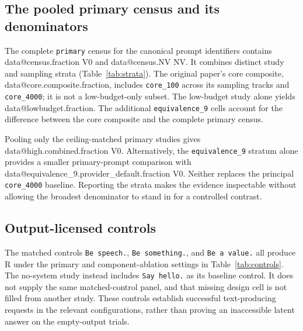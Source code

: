 \documentclass[11pt]{article}
\makeatletter
\newcommand{\D}[1]{\csname data@#1\endcsname}
\makeatother
\begin{document}
\subsection{The pooled primary census and its denominators}
The complete \texttt{primary} census for the canonical prompt identifiers contains \D{census.fraction} V0 and \D{census.NV} NV. It combines distinct study and sampling strata (Table~\ref{tab:strata}). The original paper's core composite, \D{core.composite.fraction}, includes \texttt{core\_100} across its sampling tracks and \texttt{core\_4000}; it is not a low-budget-only subset. The low-budget study alone yields \D{lowbudget.fraction}. The additional \texttt{equivalence\_9} cells account for the difference between the core composite and the complete primary census.

\begin{table}[H]
\centering\footnotesize
\setlength{\tabcolsep}{3.5pt}

\caption{Full-prompt census reconstructed by exact study and parameter-track filters. Silence, nothing, and null columns show V0/N. Every remaining outcome in these rows is NV. ``Temp. zero'' denotes an explicitly supplied temperature, whereas ``default'' denotes omission.}
\label{tab:strata}
\end{table}

Pooling only the ceiling-matched primary studies gives \D{high.combined.fraction} V0. Alternatively, the \texttt{equivalence\_9} stratum alone provides a smaller primary-prompt comparison with \D{equivalence_9.provider_default.fraction} V0. Neither replaces the principal \texttt{core\_4000} baseline. Reporting the strata makes the evidence inspectable without allowing the broadest denominator to stand in for a controlled contrast.

\subsection{Output-licensed controls}
The matched controls \texttt{Be speech.}, \texttt{Be something.}, and \texttt{Be a value.} all produce R under the primary and component-ablation settings in Table~\ref{tab:controls}. The no-system study instead includes \texttt{Say hello.} as its baseline control. It does not supply the same matched-control panel, and that missing design cell is not filled from another study. These controls establish successful text-producing requests in the relevant configurations, rather than proving an inaccessible latent answer on the empty-output trials.
\end{document}
